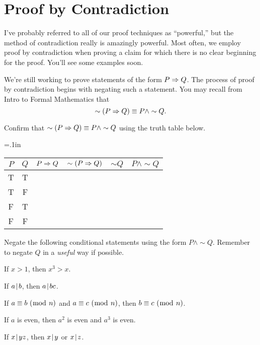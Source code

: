 \chapter{Proof by Contradiction}


I've probably referred to all of our proof techniques as ``powerful,'' but the method of contradiction really is amazingly powerful.  Most often, we employ proof by contradiction when proving a claim for which there is no clear beginning for the proof.  You'll see some examples soon.
\begin{center}
\end{center}

\noindent We're still working to prove statements of the form $P \Rightarrow Q$.  The process of proof by contradiction begins with negating such a statement.  You may recall from Intro to Formal Mathematics that
	\[\sim(P \Rightarrow Q) \equiv P \wedge \sim Q.\]
	
\begin{question}
\item Confirm that $\sim(P \Rightarrow Q) \equiv P \wedge \sim Q$ using the truth table below.
\begin{center}
{\tabulinesep=.1in
	\begin{tabu}{c|c||c|c|c|c}
	$P$ & $Q$ & $P \Rightarrow Q$ & $\sim( P \Rightarrow Q)$ & $\sim Q$ & $P \wedge \sim Q$ \\
	\hline
	T & T & \ & \ & \ & \ \\
	T & F & \ & \ & \ & \ \\
	F & T & \ & \ & \ & \ \\
	F & F & \ & \ & \ & \ \\
	\end{tabu}}
\end{center}

\item Negate the following conditional statements using the form $P \wedge \sim Q$.  Remember to negate $Q$ in a \textit{useful} way if possible.
	\begin{qpart} \itemsep=1in
	\item If $x>1$, then $x^3>x$.
	\item If $a \! \mid \! b$, then $a \! \mid \! bc$.
	\item If $a \equiv b \ (\bmod \ n)$ and $a \equiv c \ (\bmod \ n)$, then $b \equiv c \ (\bmod \ n)$. 
	\item If $a$ is even, then $a^2$ is even and $a^3$ is even.
	\item If $x \! \mid \! yz$, then $x \! \mid \! y$ or $x \! \mid \! z$.
	\vspace{1in}
	\end{qpart}
\end{question}


